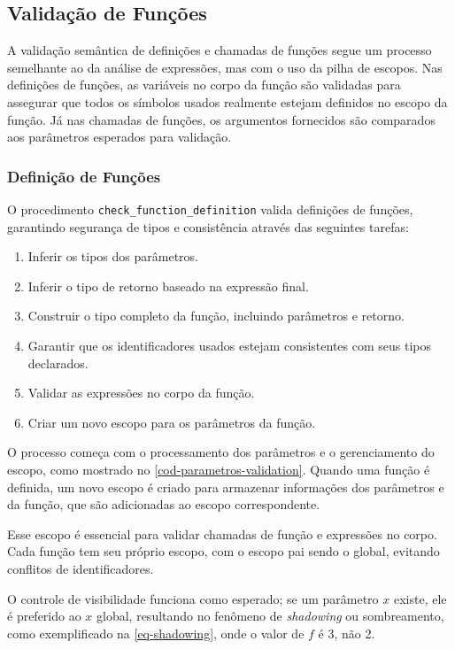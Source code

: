 


\subsection{Validação de Funções}
A validação semântica de definições e chamadas de funções segue um processo semelhante ao da análise de expressões, mas com o uso da pilha de escopos.
Nas definições de funções, as variáveis no corpo da função são validadas para assegurar que todos os símbolos usados realmente estejam definidos no escopo da função. Já nas chamadas de funções, os argumentos fornecidos são comparados aos parâmetros esperados para validação.

\subsubsection{Definição de Funções} \label{subsubsection-eq-func-defn}

O procedimento \verb"check_function_definition" valida definições de funções, garantindo segurança de tipos e consistência através das seguintes tarefas:

\begin{enumerate}
    \item Inferir os tipos dos parâmetros.
    \item Inferir o tipo de retorno baseado na expressão final.
    \item Construir o tipo completo da função, incluindo parâmetros e retorno.
    \item Garantir que os identificadores usados estejam consistentes com seus tipos declarados.
    \item Validar as expressões no corpo da função.
    \item Criar um novo escopo para os parâmetros da função.
\end{enumerate}

O processo começa com o processamento dos parâmetros e o gerenciamento do escopo, como mostrado no \autoref{cod-parametros-validation}. Quando uma função é definida, um novo escopo é criado para armazenar informações dos parâmetros e da função, que são adicionadas ao escopo correspondente.

Esse escopo é essencial para validar chamadas de função e expressões no corpo. Cada função tem seu próprio escopo, com o escopo pai sendo o global, evitando conflitos de identificadores.

O controle de visibilidade funciona como esperado; se um parâmetro $x$ existe, ele é preferido ao $x$ global, resultando no fenômeno de \textit{shadowing} ou sombreamento, como exemplificado na \autoref{eq-shadowing}, onde o valor de $f$ é 3, não 2.

